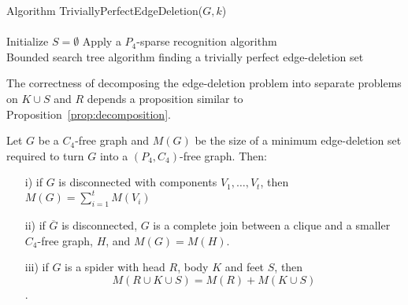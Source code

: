 \documentclass{llncs}
\begin{document}
\begin{algorithm}[H]
\SetAlgoLined Algorithm {\sc TriviallyPerfectEdgeDeletion($G,k$)}\\
\ \\
Initialize $S = \emptyset$\;
Apply a $P_4$-sparse recognition algorithm\;
\ \\
\caption{Bounded search tree algorithm finding a trivially perfect edge-deletion set}
\label{alg:TrivPer}
\end{algorithm}

The correctness of decomposing the edge-deletion problem into separate problems on $K\cup S$ and $R$ depends a proposition similar to Proposition~\ref{prop:decomposition}.

\begin{proposition}\label{prop:trivperdecomp}
 Let $G$ be a $C_4$-free graph and $M(G)$ be the size of a minimum edge-deletion set required to turn $G$ into a $(P_4,C_4)$-free graph. Then:
 \begin{itemize}
 \item[i)] if $G$ is disconnected with components $V_1, \ldots , V_t$, then $M(G) = \sum_{i=1}^t M(V_i)$
 \item[ii)] if $\overline{G}$ is disconnected, $G$ is a complete join between a clique and a smaller $C_4$-free graph, $H$, and $M(G) = M(H)$.
 \item[iii)] if $G$ is a spider with head $R$, body $K$ and feet $S$, then $$M(R\cup K\cup S) = M(R) + M(K\cup S)$$.
 \end{itemize}
\end{proposition}
\end{document}
